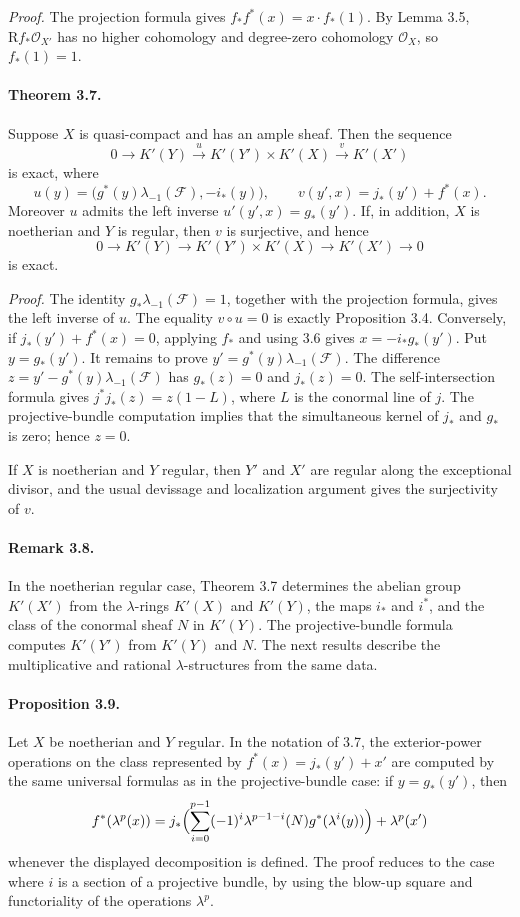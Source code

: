 \documentclass[12pt]{article}
\newcommand{\cO}{\mathcal O}
\newcommand{\uF}{\mathcal F}
\newcommand{\RR}{\mathrm R}
\newcommand{\xto}[1]{\xrightarrow{#1}}
\begin{document}
\emph{Proof.} The projection formula gives $f_*f^*(x)=x\cdot f_*(1)$. By Lemma 3.5, $\RR f_*\cO_{X'}$ has no higher cohomology and degree-zero cohomology $\cO_X$, so $f_*(1)=1$.

\paragraph{Theorem 3.7.} Suppose $X$ is quasi-compact and has an ample sheaf. Then the sequence
\[
0\longrightarrow K'(Y)\xto{u}K'(Y')\times K'(X)\xto{v}K'(X')
\]
is exact, where
\[
u(y)=\bigl(g^*(y)\lambda_{-1}(\uF),-i_*(y)\bigr),
\qquad
v(y',x)=j_*(y')+f^*(x).
\]
Moreover $u$ admits the left inverse $u'(y',x)=g_*(y')$. If, in addition, $X$ is noetherian and $Y$ is regular, then $v$ is surjective, and hence
\[
0\to K'(Y)\to K'(Y')\times K'(X)\to K'(X')\to0
\]
is exact.

\emph{Proof.} The identity $g_*\lambda_{-1}(\uF)=1$, together with the projection formula, gives the left inverse of $u$. The equality $v\circ u=0$ is exactly Proposition 3.4. Conversely, if $j_*(y')+f^*(x)=0$, applying $f_*$ and using 3.6 gives $x=-i_*g_*(y')$. Put $y=g_*(y')$. It remains to prove $y'=g^*(y)\lambda_{-1}(\uF)$. The difference $z=y'-g^*(y)\lambda_{-1}(\uF)$ has $g_*(z)=0$ and $j_*(z)=0$. The self-intersection formula gives $j^*j_*(z)=z(1-L)$, where $L$ is the conormal line of $j$. The projective-bundle computation implies that the simultaneous kernel of $j_*$ and $g_*$ is zero; hence $z=0$.

If $X$ is noetherian and $Y$ regular, then $Y'$ and $X'$ are regular along the exceptional divisor, and the usual devissage and localization argument gives the surjectivity of $v$.

\paragraph{Remark 3.8.} In the noetherian regular case, Theorem 3.7 determines the abelian group $K'(X')$ from the $\lambda$-rings $K'(X)$ and $K'(Y)$, the maps $i_*$ and $i^*$, and the class of the conormal sheaf $N$ in $K'(Y)$. The projective-bundle formula computes $K'(Y')$ from $K'(Y)$ and $N$. The next results describe the multiplicative and rational $\lambda$-structures from the same data.

\paragraph{Proposition 3.9.} Let $X$ be noetherian and $Y$ regular. In the notation of 3.7, the exterior-power operations on the class represented by $f^*(x)=j_*(y')+x'$ are computed by the same universal formulas as in the projective-bundle case: if $y=g_*(y')$, then
\[
f^*(\lambda^p(x))=j_*\Bigl(\sum_{i=0}^{p-1}(-1)^i\lambda^{p-1-i}(N)g^*(\lambda^i(y))\Bigr)+\lambda^p(x')
\]
whenever the displayed decomposition is defined. The proof reduces to the case where $i$ is a section of a projective bundle, by using the blow-up square and functoriality of the operations $\lambda^p$.
\end{document}
